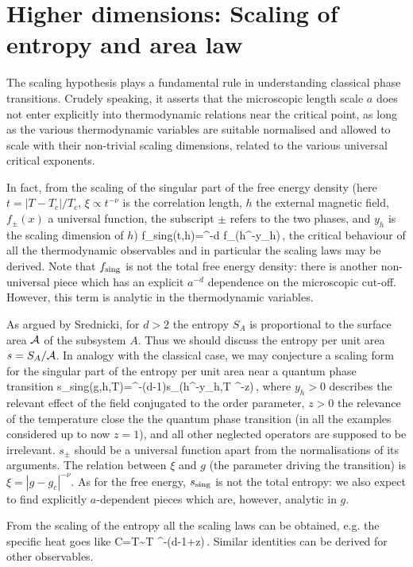 \documentclass[12pt,aps]{revtex4}
\begin{document}
\section{Higher dimensions: Scaling of entropy and area law}
\label{secthd}

The scaling hypothesis plays a fundamental rule in understanding
classical phase transitions. Crudely speaking, it asserts that the
microscopic length scale $a$ does not enter explicitly into thermodynamic
relations near the critical point, as long as the various thermodynamic
variables are suitable normalised and
allowed to scale with their non-trivial scaling dimensions, related to
the various universal critical exponents.

In fact, from the scaling of the singular part of the free energy density
(here $t=|T-T_c|/T_c$, $\xi\propto t^{-\nu}$ is the correlation length,
$h$ the external magnetic field, $f_{\pm}(x)$ a universal function,
the subscript $\pm$ refers to the two phases, and $y_h$ is the scaling
dimension of $h$)
\be
f_{\rm sing}(t,h)=\xi^{-d} f_{\pm}(h\xi^{-y_h})\,,
\ee
the critical behaviour of all the thermodynamic observables and in particular
the scaling laws may be derived. Note that $f_{\rm sing}$ is not the
total free energy density: there is another non-universal piece which
has an explicit $a^{-d}$ dependence on the microscopic cut-off. However,
this term is analytic in the thermodynamic variables.

As argued by Srednicki\cite{s-93}, for $d>2$ the entropy $S_A$ is
proportional to the surface area $\cal A$ of the subsystem $A$. Thus we
should discuss the entropy per unit area $s=S_A/{\cal A}$.
In analogy with the classical case, we may conjecture a scaling
form for the singular part of the
entropy per unit area near a quantum phase transition
\be
s_{\rm sing}(g,h,T)=\xi^{-(d-1)}s_\pm(h\xi^{-y_h},T \xi^{-z})\,,
\label{Sscal}
\ee
where $y_h>0$ describes the relevant effect of the field conjugated to the
order parameter, $z>0$ the
relevance of the temperature close the the quantum phase transition (in all
the examples considered up to now $z=1$), and all
other neglected operators are supposed to be irrelevant.
$s_\pm$ should be a universal function apart from
the normalisations of its arguments.
The relation between $\xi$ and $g$ (the parameter driving the transition)
is $\xi=|g-g_c|^{-\nu}$.
As for the free energy, $s_{\rm sing}$ is not the total entropy: we also
expect to find explicitly $a$-dependent pieces which are, however,
analytic in $g$.

From the scaling of the entropy all the scaling laws
can be obtained, e.g. the specific heat goes like
\be
C=T\sim T \xi^{-(d-1+z)}\,.
\ee
Similar identities can be derived for other observables.
\end{document}
